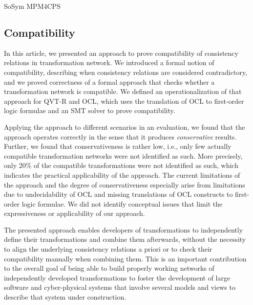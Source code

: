\begin{copiedFrom}{SoSym MPM4CPS}

\subsection{Compatibility}

In this article, we presented an approach to prove compatibility of consistency relations in transformation network.
We introduced a formal notion of compatibility, describing when consistency relations are considered contradictory, and we proved correctness of a formal approach that checks whether a transformation network is compatible.
We defined an operationalization of that approach for QVT-R and OCL, which uses the translation of OCL to first-order logic formulae and an SMT solver to prove compatibility.

Applying the approach to different scenarios in an evaluation, we found that the approach operates correctly in the sense that it produces \emph{conservative} results.
Further, we found that conservativeness is rather low, i.e., only few actually compatible transformation networks were not identified as such.
More precisely, only 20\% of the compatible transformations were not identified as such, which indicates the practical applicability of the approach.
The current limitations of the approach and the degree of conservativeness especially arise from limitations due to undecidability of OCL and missing translations of OCL constructs to first-order logic formulae.
We did not identify conceptual issues that limit the expressiveness or applicability of our approach.

The presented approach enables developers of transformations to independently define their transformations and combine them afterwards, without the necessity to align the underlying consistency relations a priori or to check their compatibility manually when combining them.
This is an important contribution to the overall goal of being able to build properly working networks of independently developed transformations to foster the development of large software and cyber-physical systems that involve several models and views to describe that system under construction.


\end{copiedFrom} %



